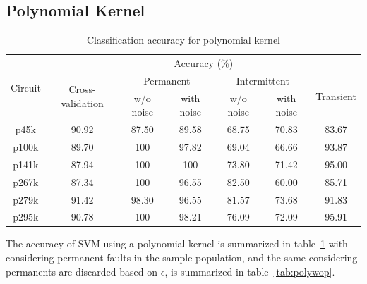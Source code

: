 \subsection{Polynomial Kernel}
\begin{table}[h]

	\captionsetup{justification=centering}
\begin{tabular}{ccccccc}
\hline
\multirow{3}{*}{Circuit} & \multicolumn{6}{c}{Accuracy (\%)}\\ \cline{2-7} 
                         & \multirow{2}{*}{Cross-validation} & \multicolumn{2}{c}{Permanent} & \multicolumn{2}{c}{Intermittent} & \multirow{2}{*}{Transient} \\ \cline{3-6}
                         &                                   & w/o noise     & with noise    & w/o noise      & with noise      &                            \\ \hline
p45k                     & 90.92                             & 87.50         & 89.58         & 68.75          & 70.83           & 83.67                      \\
p100k                    & 89.70                             & 100           & 97.82         & 69.04          & 66.66           & 93.87                      \\
p141k                    & 87.94                             & 100           & 100           & 73.80          & 71.42           & 95.00                      \\
p267k                    & 87.34                             & 100           & 96.55         & 82.50          & 60.00           & 85.71                      \\
p279k                    & 91.42                             & 98.30         & 96.55         & 81.57          & 73.68           & 91.83                      \\
p295k                    & 90.78                             & 100           & 98.21         & 76.09          & 72.09           & 95.91      \\
\hline                                                     
\end{tabular}
\caption {Classification accuracy for polynomial kernel}
\label{tab:polywp}
\end{table}

The accuracy of SVM using a polynomial kernel is summarized in table~\ref{tab:polywp} with considering permanent faults in the sample population, and the same considering permanents are discarded based on $\epsilon$, is summarized in table~\ref{tab:polywop}.

